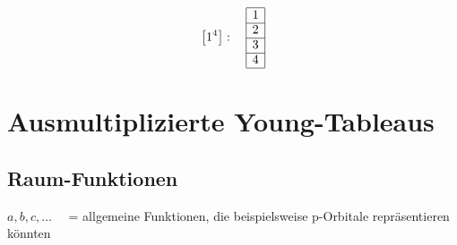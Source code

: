 \documentclass[fleqn]{article}%
\begin{document}
\vspace{0.25cm}%
\begin{dmath*}\left[1^4\right]:\quad\begin{array}{|c|} \hline 1\\ \cline{1-1} 2\\ \cline{1-1} 3\\ \cline{1-1} 4\\ \cline{1-1} \end{array} \end{dmath*}%
\vspace{0.25cm}%
\newpage%
\section{Ausmultiplizierte Young{-}Tableaus}%
\label{sec:AusmultiplizierteYoung{-}Tableaus}%

%
\subsection{Raum{-}Funktionen}%
\label{subsec:Raum{-}Funktionen}%
$a, b, c, \hdots \quad $ = allgemeine Funktionen, die beispielsweise p-Orbitale repräsentieren könnten
\end{document}
